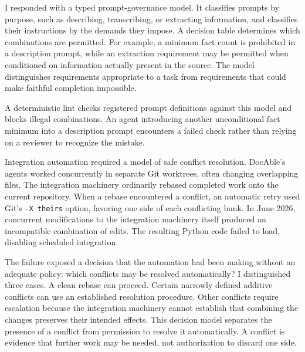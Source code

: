 I responded with a typed prompt-governance model. It classifies prompts by purpose, such as describing, transcribing, or extracting information, and classifies their instructions by the demands they impose. A decision table determines which combinations are permitted. For example, a minimum fact count is prohibited in a description prompt, while an extraction requirement may be permitted when conditioned on information actually present in the source. The model distinguishes requirements appropriate to a task from requirements that could make faithful completion impossible.

A deterministic lint checks registered prompt definitions against this model and blocks illegal combinations. An agent introducing another unconditional fact minimum into a description prompt encounters a failed check rather than relying on a reviewer to recognize the mistake.

Integration automation required a model of safe conflict resolution. DocAble's agents worked concurrently in separate Git worktrees, often changing overlapping files. The integration machinery ordinarily rebased completed work onto the current repository. When a rebase encountered a conflict, an automatic retry used Git's \texttt{-X theirs} option, favoring one side of each conflicting hunk. In June 2026, concurrent modifications to the integration machinery itself produced an incompatible combination of edits. The resulting Python code failed to load, disabling scheduled integration.

The failure exposed a decision that the automation had been making without an adequate policy: which conflicts may be resolved automatically? I distinguished three cases. A clean rebase can proceed. Certain narrowly defined additive conflicts can use an established resolution procedure. Other conflicts require escalation because the integration machinery cannot establish that combining the changes preserves their intended effects. This decision model separates the presence of a conflict from permission to resolve it automatically. A conflict is evidence that further work may be needed, not authorization to discard one side.

